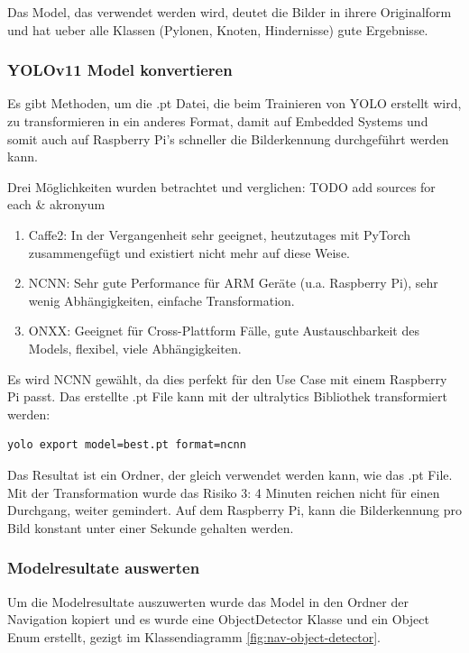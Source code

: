 Das Model, das verwendet werden wird, deutet die Bilder in ihrere Originalform und hat ueber alle Klassen (Pylonen, Knoten, Hindernisse) gute Ergebnisse.



\subsubsection{YOLOv11 Model konvertieren}
\label{convert-yolo}

Es gibt Methoden, um die .pt Datei, die beim Trainieren von YOLO erstellt wird, zu transformieren in ein anderes Format, damit auf Embedded Systems und somit auch auf Raspberry Pi's schneller die Bilderkennung durchgeführt werden kann.

Drei Möglichkeiten wurden betrachtet und verglichen:
TODO add sources for each \& akronyum
\begin{enumerate}
    \item Caffe2: In der Vergangenheit sehr geeignet, heutzutages mit PyTorch zusammengefügt und existiert nicht mehr auf diese Weise.
    \item NCNN: Sehr gute Performance für ARM Geräte (u.a. Raspberry Pi), sehr wenig Abhängigkeiten, einfache Transformation.
    \item ONXX: Geeignet für  Cross-Plattform Fälle, gute Austauschbarkeit des Models, flexibel, viele Abhängigkeiten.
\end{enumerate}

Es wird NCNN gewählt, da dies perfekt für den Use Case mit einem Raspberry Pi passt. Das erstellte .pt File kann mit der ultralytics Bibliothek transformiert werden:

\begin{verbatim}
yolo export model=best.pt format=ncnn
\end{verbatim}

Das Resultat ist ein Ordner, der gleich verwendet werden kann, wie das .pt File. Mit der Transformation wurde das Risiko 3: 4 Minuten reichen nicht für einen Durchgang, weiter gemindert. Auf dem Raspberry Pi, kann die Bilderkennung pro Bild konstant unter einer Sekunde gehalten werden.

\subsubsection{Modelresultate auswerten}
\label{model-results}

Um die Modelresultate auszuwerten wurde das Model in den Ordner der Navigation kopiert und es wurde eine ObjectDetector Klasse und ein Object Enum erstellt, gezigt im Klassendiagramm \ref{fig:nav-object-detector}.


